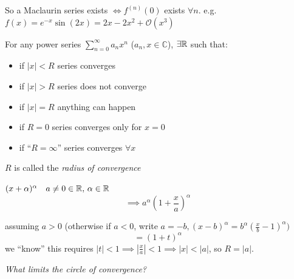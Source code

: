 \documentclass[10pt]{scrartcl}
\begin{document}
So a Maclaurin series exists $\iff f^{(n)}(0)$ exists $\forall n$. e.g. $f(x) = e^{-x}\sin(2x) = 2x - 2x^2 + \mathcal{O}(x^3)$

\vspace*{5pt}

\begin{definition}
For any power series $\displaystyle{\sum_{n=0}^{\infty} a_nx^n}$ ($a_n, x \in \mathbb{C}$), $\exists \mathbb{R}$ such that:

\begin{itemize}
\item if $|x| < R$ series converges
\item if $|x| > R$ series does not converge
\item if $|x| = R$ anything can happen
\item if $R = 0$ series converges only for $x = 0$
\item if ``$R = \infty$'' series converges $\forall x$
\end{itemize}

$R$ is called the \emph{radius of convergence}
\end{definition}\vspace*{-10pt}


\begin{center}
\end{center}


\begin{example}$(x+\alpha)^{\alpha} \quad a \neq 0 \in \mathbb{R},\, \alpha \in \mathbb{R}$
\[\implies a^{\alpha}(1 + \frac{x}{a})^{\alpha}\]

assuming $a >0$ (otherwise if $a <0$, write $a=-b, (x-b)^{\alpha} = b^{\alpha}(\frac{x}{b} -1)^{\alpha})$
\[= (1+t)^{\alpha}\]
 we ``know'' this requires $|t|<1 \implies |\frac{x}{a}| < 1 \implies |x| < |a|$, so $\boxed{R = |a|}$.
\end{example}\vspace*{5pt}


\emph{What limits the circle of convergence?}
\end{document}

